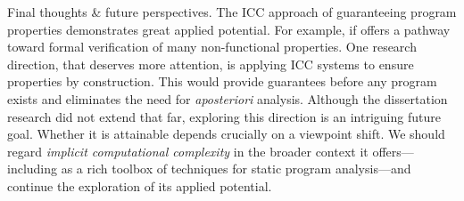 {Final thoughts \& future perspectives.} The ICC approach of
guaranteeing program properties demonstrates great applied potential. For
example, if offers a pathway toward formal verification of many non-functional
properties. One research direction, that deserves more attention, is applying
ICC systems to ensure properties by construction. This would provide guarantees
before any program exists and eliminates the need for \emph{aposteriori}
analysis. Although the dissertation research did not extend that far, exploring
this direction is an intriguing future goal. Whether it is attainable depends
crucially on a viewpoint shift. We should regard \emph{implicit computational
complexity} in the broader context it offers---including as a rich toolbox of
techniques for static program analysis---and continue the exploration of its
applied potential.

